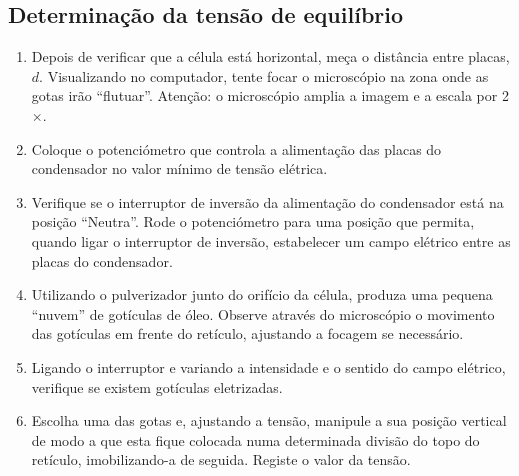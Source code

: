 \documentclass[12pt,a4paper,oneside]{paper}
\begin{document}
\subsection{\sf Determinação da tensão de equilíbrio}
\begin{enumerate}
\item   Depois de verificar que a célula está horizontal, meça o distância entre placas, $d$. Visualizando no computador,
tente focar o microscópio na zona onde as gotas irão ``flutuar''. Atenção: o microscópio amplia a imagem e a escala por 2$\times$.

\item Coloque o potenciómetro que controla a alimentação das placas do condensador no valor mínimo de tensão elétrica. 

\item    Verifique se o interruptor de inversão da alimentação do condensador está na posição ``Neutra''. Rode o potenciómetro
para uma posição que permita, quando ligar o interruptor de inversão, estabelecer um campo elétrico entre as placas do condensador. 

\item     Utilizando o pulverizador junto do orifício da célula, produza uma pequena ``nuvem'' de gotículas de óleo. Observe
através do microscópio o movimento das gotículas em frente do retículo, ajustando a focagem se necessário.

\item     Ligando o interruptor e variando a intensidade  e o  sentido do campo elétrico, verifique se existem gotículas eletrizadas. 

 \item Escolha uma das gotas e, ajustando a tensão, manipule a sua posição vertical de modo a que esta fique colocada numa
 determinada divisão do topo do retículo, imobilizando-a de seguida. Registe o valor da tensão. 
 \end{enumerate}
 
\end{document}
